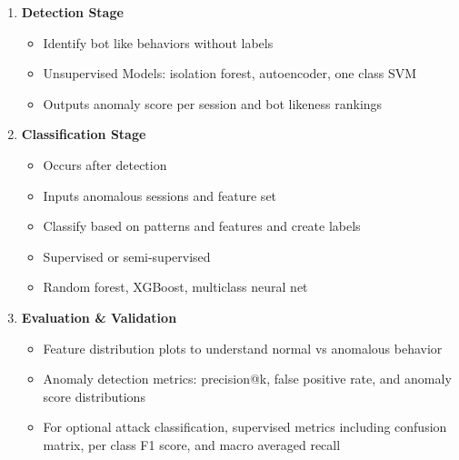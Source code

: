 \documentclass{article}
\begin{document}
\begin{enumerate}
    \item \textbf{Detection Stage}
    \begin{itemize}
        \item Identify bot like behaviors without labels 
        \item Unsupervised Models: isolation forest, autoencoder, one class SVM
        \item Outputs anomaly score per session and bot likeness rankings
    \end{itemize}
    \item \textbf{Classification Stage}
    \begin{itemize}
        \item Occurs after detection
        \item Inputs anomalous sessions and feature set
        \item Classify based on patterns and features and create labels
        \item Supervised or semi-supervised
        \item Random forest, XGBoost, multiclass neural net 
    \end{itemize}
    \item \textbf{Evaluation \& Validation}
    \begin{itemize}
        \item Feature distribution plots to understand normal vs anomalous behavior
        \item Anomaly detection metrics: precision@k, false positive rate, and anomaly score distributions
        \item For optional attack classification, supervised metrics including confusion matrix, per class F1 score, and macro averaged recall
    \end{itemize}
   
\end{enumerate}
\end{document}
